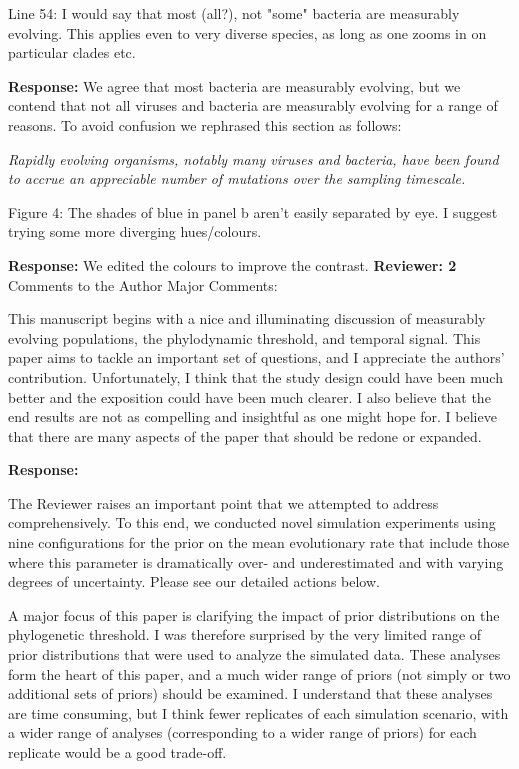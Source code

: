 \documentclass[11pt]{article}
\begin{document}
Line 54: I would say that most (all?), not "some" bacteria are measurably evolving. This applies even to very diverse species, as long as one zooms in on particular clades etc.

{\color{blue}\textbf{Response:}
We agree that most bacteria are measurably evolving, but we contend that not all viruses and bacteria are measurably evolving for a range of reasons. To avoid confusion we rephrased this section as follows:

\textit{Rapidly evolving organisms, notably many viruses and bacteria, have been found to accrue an appreciable number of mutations over the sampling timescale.}
}


Figure 4: The shades of blue in panel b aren't easily separated by eye. I suggest trying some more diverging hues/colours.

{\color{blue}
\textbf{Response:}
We edited the colours to improve the contrast.
}
\newline
\newline
\textbf{Reviewer: 2}
\newline
Comments to the Author
Major Comments:

This manuscript begins with a nice and illuminating discussion of measurably evolving populations, the phylodynamic threshold, and temporal signal. This paper aims to tackle an important set of questions, and I appreciate the authors' contribution. Unfortunately, I think that the study design could have been much better and the exposition could have been much clearer. I also believe that the end results are not as compelling and insightful as one might hope for. I believe that there are many aspects of the paper that should be redone or expanded.

{\color{blue}
\textbf{Response:}

The Reviewer raises an important point that we attempted to address comprehensively. To this end, we conducted novel simulation experiments using nine configurations for the prior on the mean evolutionary rate that include those where this parameter is dramatically over- and underestimated and with varying degrees of uncertainty. Please see our detailed actions below.
}

A major focus of this paper is clarifying the impact of prior distributions on the phylogenetic threshold. I was therefore surprised by the very limited range of prior distributions that were used to analyze the simulated data. These analyses form the heart of this paper, and a much wider range of priors (not simply or two additional sets of priors) should be examined. I understand that these analyses are time consuming, but I think fewer replicates of each simulation scenario, with a wider range of analyses (corresponding to a wider range of priors) for each replicate would be a good trade-off. 
\end{document}

